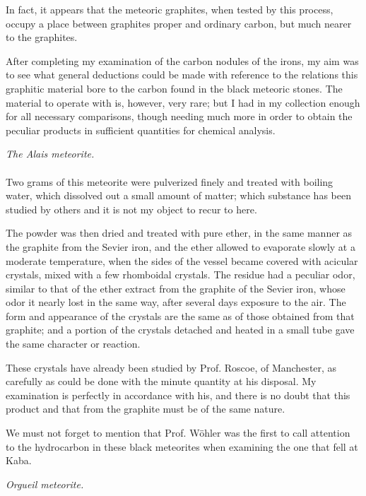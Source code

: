\documentclass[a4paper, 11pt, oneside, english]{article}
\begin{document}
In fact, it appears that the meteoric graphites, when tested by this process, occupy a place between graphites proper and ordinary carbon, but much nearer to the graphites.

After completing my examination of the carbon nodules of the irons, my aim was to see what general deductions could be made with reference to the relations this graphitic material bore to the carbon found in the black meteoric stones. The material to operate with is, however, very rare; but I had in my collection enough for all necessary comparisons, though needing much more in order to obtain the peculiar products in sufficient quantities for chemical analysis.
\begin{center}
\emph{The Alais meteorite.}
\end{center}
\paragraph{}
Two grams of this meteorite were pulverized finely and treated with boiling water, which dissolved out a small amount of matter; which substance has been studied by others and it is not my object to recur to here.

The powder was then dried and treated with pure ether, in the same manner as the graphite from the Sevier iron, and the ether allowed to evaporate slowly at a moderate temperature, when the sides of the vessel became covered with acicular crystals, mixed with a few rhomboidal crystals. The residue had a peculiar odor, similar to that of the ether extract from the graphite of the Sevier iron, whose odor it nearly lost in the same way, after several days exposure to the air. The form and appearance of the crystals are the same as of those obtained from that graphite; and a portion of the crystals detached and heated in a small tube gave the same character or reaction.

These crystals have already been studied by Prof. Roscoe, of Manchester, as carefully as could be done with the minute quantity at his disposal. My examination is perfectly in accordance with his, and there is no doubt that this product and that from the graphite must be of the same nature.

We must not forget to mention that Prof. Wöhler was the first to call attention to the hydrocarbon in these black meteorites when examining the one that fell at Kaba.
\begin{center}
\emph{Orgueil meteorite.}
\end{center}
\end{document}
